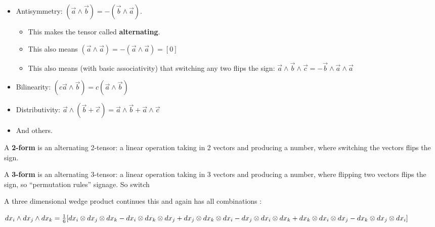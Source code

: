 \documentclass[11pt, oneside]{article}   	%
\begin{document}
\begin{itemize}
\item Antisymmetry: $(\vec{a} \wedge \vec{b}) = -(\vec{b} \wedge \vec{a})$.  
\begin{itemize}
\item This makes the tensor called \textbf{alternating}. 
\item This also means $(\vec{a} \wedge \vec{a}) = -(\vec{a} \wedge \vec{a}) = [0]$
\item This also means (with basic associativity) that switching any two flips the sign: $\vec{a} \wedge \vec{b} \wedge \vec{c} = -\vec{b} \wedge \vec{a} \wedge \vec{a}$
\end{itemize}
\item Bilinearity:  $(c\vec{a} \wedge \vec{b}) = c(\vec{a} \wedge \vec{b})$
\item Distributivity: $\vec{a} \wedge (\vec{b} + \vec{c} ) = \vec{a} \wedge \vec{b} + \vec{a} \wedge \vec{c}   $
\item And others.
\end{itemize}

A \textbf{2-form} is an alternating 2-tensor: a linear operation taking in 2 vectors and producing a number, where switching the vectors flips the sign.

A \textbf{3-form} is an alternating 3-tensor: a linear operation taking in 3 vectors and producing a number, where flipping two vectors flips the sign, so ``permutation rules'' signage.  So switch 

A three dimensional wedge product continues this and again has all combinations :

$dx_i \wedge dx_j \wedge dx_k = \frac{1}{6}[ \\
	dx_i \otimes dx_j \otimes dx_k - dx_i \otimes dx_k \otimes dx_j \\
	+ dx_j \otimes dx_k \otimes dx_i - dx_j \otimes dx_i \otimes dx_k \\
	+ dx_k \otimes dx_i \otimes dx_j - dx_k \otimes dx_j \otimes dx_i ]$
	
\end{document}
